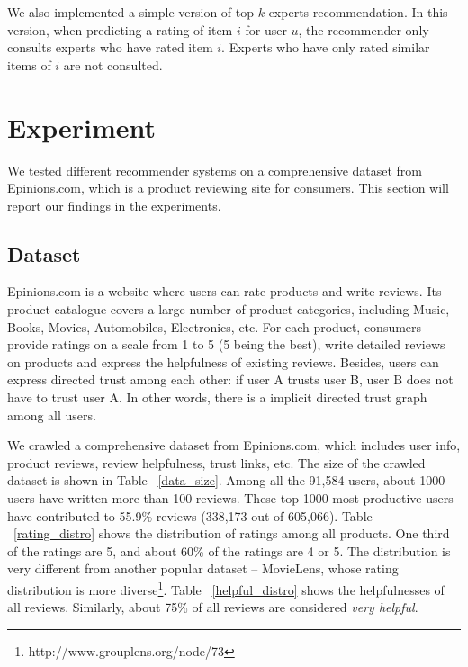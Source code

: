 \documentclass[12pt]{article}
\begin{document}
We also implemented a simple version of top $k$ experts recommendation. In this version, when predicting a rating of item $i$ for user $u$, the recommender only consults experts who have rated item $i$. Experts who have only rated similar items of $i$ are not consulted.
 



\section{Experiment}
We tested different recommender systems on a comprehensive dataset from Epinions.com, which is a product reviewing site for consumers. This section will report our findings in the experiments.  
\subsection{Dataset}
Epinions.com is a website where users can rate products and write reviews. Its product catalogue covers a large number of product categories, including Music, Books, Movies, Automobiles, Electronics, etc. For each product, consumers provide ratings on a scale from 1 to 5 (5 being the best), write detailed reviews on products and express the helpfulness of existing reviews. Besides, users can express directed trust among each other: if user A trusts user B, user B does not have to trust user A. In other words, there is a implicit directed trust graph among all users. 

We crawled a comprehensive dataset from Epinions.com, which includes user info, product reviews, review helpfulness, trust links, etc. The size of the crawled dataset is shown in Table ~\ref{data_size}. Among all the 91,584 users, about 1000 users have written more than 100 reviews. These top 1000 most productive users have contributed to 55.9\% reviews (338,173 out of 605,066).  Table ~\ref{rating_distro} shows the distribution of ratings among all products. One third of the ratings are 5, and about 60\% of the ratings are 4 or 5. The distribution is very different from another popular dataset -- MovieLens, whose rating distribution is more diverse\footnote[1]{http://www.grouplens.org/node/73}. Table ~\ref{helpful_distro} shows the helpfulnesses of all reviews. Similarly, about 75\% of all reviews are considered \emph{very helpful}. 
\end{document}
